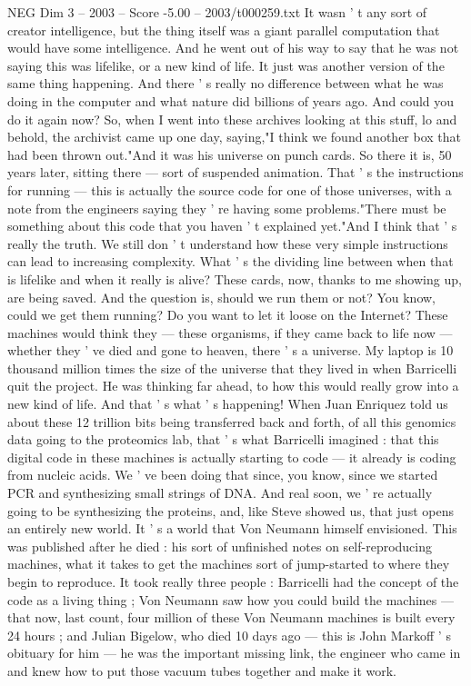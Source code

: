 \begin{textsample}{NEG Dim 3 – 2003 – Score -5.00 – 2003/t000259.txt}
It wasn ' t any sort of creator intelligence, but the thing itself was a giant parallel computation that would have some intelligence.
And he went out of his way to say that he was not saying this was lifelike, or a new kind of life.
It just was another version of the same thing happening.
And there ' s really no difference between what he was doing in the computer and what nature did billions of years ago.
And could you do it again now?
So, when I went into these archives looking at this stuff, lo and behold, the archivist came up one day, saying,"I think we found another box that had been thrown out."And it was his universe on punch cards.
So there it is, 50 years later, sitting there — sort of suspended animation.
That ' s the instructions for running — this is actually the source code for one of those universes, with a note from the engineers saying they ' re having some problems."There must be something about this code that you haven ' t explained yet."And I think that ' s really the truth.
We still don ' t understand how these very simple instructions can lead to increasing complexity.
What ' s the dividing line between when that is lifelike and when it really is alive?
These cards, now, thanks to me showing up, are being saved.
And the question is, should we run them or not?
You know, could we get them running?
Do you want to let it loose on the Internet?
These machines would think they — these organisms, if they came back to life now — whether they ' ve died and gone to heaven, there ' s a universe.
My laptop is 10 thousand million times the size of the universe that they lived in when Barricelli quit the project.
He was thinking far ahead, to how this would really grow into a new kind of life.
And that ' s what ' s happening!
When Juan Enriquez told us about these 12 trillion bits being transferred back and forth, of all this genomics data going to the proteomics lab, that ' s what Barricelli imagined : that this digital code in these machines is actually starting to code — it already is coding from nucleic acids.
We ' ve been doing that since, you know, since we started PCR and synthesizing small strings of DNA.
And real soon, we ' re actually going to be synthesizing the proteins, and, like Steve showed us, that just opens an entirely new world.
It ' s a world that Von Neumann himself envisioned.
This was published after he died : his sort of unfinished notes on self-reproducing machines, what it takes to get the machines sort of jump-started to where they begin to reproduce.
It took really three people : Barricelli had the concept of the code as a living thing ; Von Neumann saw how you could build the machines — that now, last count, four million of these Von Neumann machines is built every 24 hours ; and Julian Bigelow, who died 10 days ago — this is John Markoff ' s obituary for him — he was the important missing link, the engineer who came in and knew how to put those vacuum tubes together and make it work.

\end{textsample}
